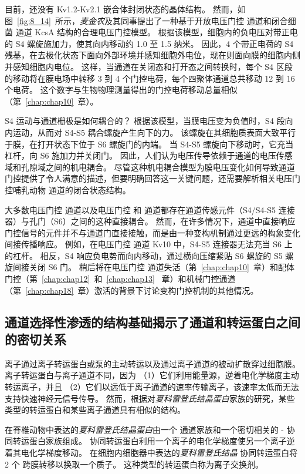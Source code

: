 目前，还没有 Kv1.2-Kv2.1 嵌合体封闭状态的晶体结构。
然而，如图~\ref{fig:8_14}~所示，\textit{麦金农}及其同事提出了一种基于开放电压门控  通道和闭合细菌  通道 KcsA 结构的合理电压门控模型。
根据该模型，细胞内的负电压对带正电的 S4 螺旋施加力，使其向内移动约 1.0 至 1.5 纳米。
因此，4 个带正电荷的 S4 残基，在去极化状态下面向外部环境并感知细胞外电位，现在则面向膜的细胞内侧并感知细胞内电位。
这样，当通道在关闭态和打开态之间转换时，每个 S4 区段的移动将在膜电场中转移 3 到 4 个门控电荷，每个四聚体通道总共移动 12 到 16 个电荷。 
这个数字与生物物理测量得出的门控电荷移动总量相似（第~\ref{chap:chap10}~章）。


S4 运动与通道栅极是如何耦合的？
根据该模型，当膜电压变为负值时，S4 段向内运动，从而对 S4-S5 耦合螺旋产生向下的力。
该螺旋在其细胞质表面大致平行于膜，在打开状态下位于 S6 螺旋门的内端。
当 S4-S5 螺旋向下移动时，它充当杠杆，向 S6 施加力并关闭门。
因此，人们认为电压传导依赖于通道的电压传感域和孔隙域之间的机电耦合。
尽管这种机电耦合模型为膜电压变化如何导致通道门控提供了令人满意的描述，但要明确回答这一关键问题，还需要解析相关电压门控哺乳动物  通道的闭合状态结构。


大多数电压门控  通道以及电压门控  和  通道都存在通道传感元件（S4/S4-S5 连接器）与孔门（S6）之间的这种直接耦合。
然而，在许多情况下，通道中直接响应门控信号的元件并不与通道门直接接触，而是由一种变构机制通过更远的构象变化间接传播响应。
例如，在电压门控  通道 Kv10 中，S4-S5 连接器无法充当 S6 上的杠杆。
相反，S4 响应负电势而向内移动，通过横向压缩紧贴 S6 螺旋的 S5 螺旋间接关闭 S6 门。
稍后将在电压门控  通道失活（第~\ref{chap:chap10}~章）和配体门控（第~\ref{chap:chap12}~和~\ref{chap:chap13}~ 章）和机械门控通道（第~\ref{chap:chap18}~章）激活的背景下讨论变构门控机制的其他情况。



\subsection{ 通道选择性渗透的结构基础揭示了通道和转运蛋白之间的密切关系}

离子通过离子转运蛋白或泵的主动转运以及通过离子通道的被动扩散穿过细胞膜。
离子转运蛋白与离子通道不同，因为
（1）它们利用能量源，逆着电化学梯度主动转运离子，并且
（2）它们以远低于离子通道的速率传输离子，该速率太低而无法支持快速神经元信号传导。
然而，根据对\textit{夏科雷登氏结晶蛋白}家族的研究，某些类型的转运蛋白和某些离子通道具有相似的结构。


在脊椎动物中表达的\textit{夏科雷登氏结晶蛋白}由一个  通道家族和一个密切相关的 - 协同转运蛋白家族组成。
协同转运蛋白利用一个离子的电化学梯度使另一个离子逆着其电化学梯度移动。
在细胞内细胞器中表达的\textit{夏科雷登氏结晶}  协同转运蛋白将 2 个  跨膜转移以换取一个质子。
这种类型的转运蛋白称为离子交换剂。



